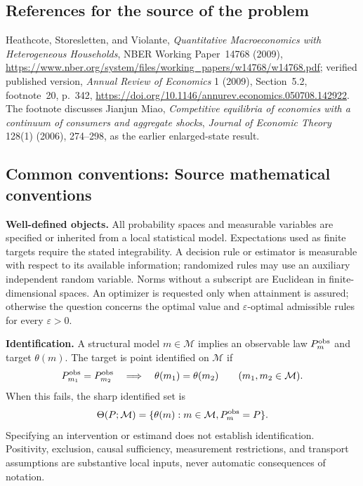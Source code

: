 \documentclass[11pt,a4paper]{article}
\begin{document}
\subsection*{References for the source of the problem}
Heathcote, Storesletten, and Violante, \emph{Quantitative Macroeconomics with Heterogeneous Households}, NBER Working Paper~14768 (2009), \url{https://www.nber.org/system/files/working_papers/w14768/w14768.pdf}; verified published version, \emph{Annual Review of Economics} 1 (2009), Section~5.2, footnote~20, p.~342, \url{https://doi.org/10.1146/annurev.economics.050708.142922}. The footnote discusses Jianjun Miao, \emph{Competitive equilibria of economies with a continuum of consumers and aggregate shocks}, \emph{Journal of Economic Theory} 128(1) (2006), 274--298, as the earlier enlarged-state result.

\subsection*{Common conventions: Source mathematical conventions}

\textbf{Well-defined objects.}
All probability spaces and measurable variables are specified or inherited
from a local statistical model. Expectations used as finite targets require
the stated integrability. A decision rule or estimator is measurable with
respect to its available information; randomized rules may use an auxiliary
independent random variable. Norms without a subscript are Euclidean in
finite-dimensional spaces. An optimizer is requested only when attainment
is assured; otherwise the question concerns the optimal value and
$\varepsilon$-optimal admissible rules for every $\varepsilon>0$.

\textbf{Identification.}
A structural model $m\in\mathcal M$ implies an observable law
$P_m^{\rm obs}$ and target $\theta(m)$. The target is point identified on
$\mathcal M$ if
\[
 P_{m_1}^{\rm obs}=P_{m_2}^{\rm obs}
 \quad\Longrightarrow\quad\theta(m_1)=\theta(m_2)
 \qquad(m_1,m_2\in\mathcal M).
\]
When this fails, the sharp identified set is
\[
 \Theta(P;\mathcal M)=\{\theta(m):m\in\mathcal M,
                                  P_m^{\rm obs}=P\}.
\]
Specifying an intervention or estimand does not establish identification.
Positivity, exclusion, causal sufficiency, measurement restrictions, and
transport assumptions are substantive local inputs, never automatic
consequences of notation.
\end{document}
